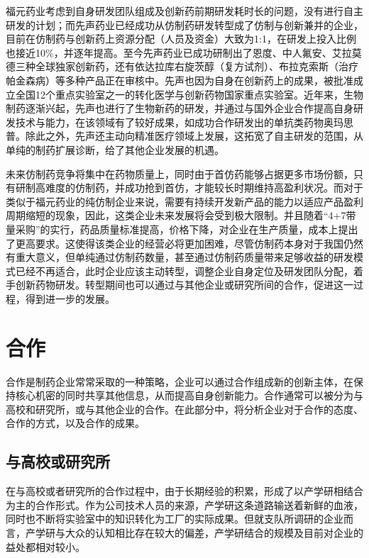 \documentclass[twocolumn]{ctexbook}
\begin{document}
			福元药业考虑到自身研发团队组成及创新药前期研发耗时长的问题，没有进行自主研发的计划；而先声药业已经成功从仿制药研发转型成了仿制与创新兼并的企业，目前在仿制药与创新药上资源分配（人员及资金）大致为1:1，在研发上投入比例也接近10\%，并逐年提高。至今先声药业已成功研制出了恩度、中人氟安、艾拉莫德三种全球独家创新药，还有依达拉库右旋茨醇（复方试剂）、布拉克索斯（治疗帕金森病）等多种产品正在审核中。先声也因为自身在创新药上的成果，被批准成立全国12个重点实验室之一的转化医学与创新药物国家重点实验室。近年来，生物制药逐渐兴起，先声也进行了生物新药的研发，并通过与国外企业合作提高自身研发技术与能力，在该领域有了较好成果，如成功合作研发出的单抗类药物奥玛思普。除此之外，先声还主动向精准医疗领域上发展，这拓宽了自主研发的范围，从单纯的制药扩展诊断，给了其他企业发展的机遇。
			
			\begin{framed}
				未来仿制药竞争将集中在药物质量上，同时由于首仿药能够占据更多市场份额，只有研制高难度的仿制药，并成功抢到首仿，才能较长时期维持高盈利状况。而对于类似于福元药业的纯仿制企业来说，需要有持续开发新产品的能力以适应产品盈利周期缩短的现象，因此，这类企业未来发展将会受到极大限制。并且随着“4+7带量采购”的实行，药品质量标准提高，价格下降，对企业在生产质量，成本上提出了更高要求。这使得该类企业的经营必将更加困难，尽管仿制药本身对于我国仍然有重大意义，但单纯通过仿制药数量，甚至通过仿制药质量带来足够收益的研发模式已经不再适合，此时企业应该主动转型，调整企业自身定位及研发团队分配，着手创新药物研发。转型期间也可以通过与其他企业或研究所间的合作，促进这一过程，得到进一步的发展。
			\end{framed}
			
		\section{合作}
		合作是制药企业常常采取的一种策略，企业可以通过合作组成新的创新主体，在保持核心机密的同时共享其他信息，从而提高自身创新能力。合作通常可以被分为与高校和研究所，或与其他企业的合作。在此部分中，将分析企业对于合作的态度、合作的方式，以及合作的成果。
		
			\subsection{与高校或研究所}
			在与高校或者研究所的合作过程中，由于长期经验的积累，形成了以产学研相结合为主的合作形式。作为公司技术人员的来源，产学研这条道路输送着新鲜的血液，同时也不断将实验室中的知识转化为工厂的实际成果。但就支队所调研的企业而言，产学研与大众的认知相比存在较大的偏差，产学研结合的规模及目前对企业的益处都相对较小。
			
\end{document}
